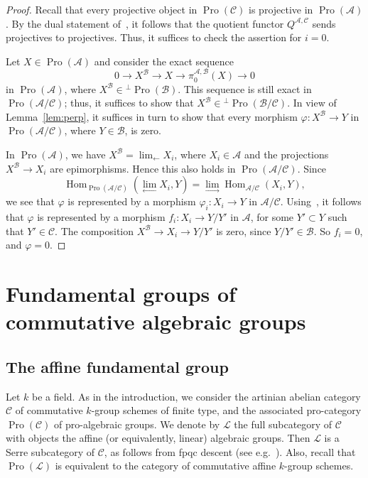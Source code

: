 \documentclass[11pt]{article}
\theoremstyle{definition}
\numberwithin{equation}{section}
\newcommand\cA{{\mathcal A}}
\newcommand\cB{{\mathcal B}}
\newcommand\cC{{\mathcal C}}
\newcommand\cL{{\mathcal L}}
\DeclareMathOperator{\Hom}{Hom}
\DeclareMathOperator{\Pro}{Pro}
\theoremstyle{remark}
\begin{document}
\begin{proof}
Recall that every projective object in $\Pro(\cC)$ is projective in $\Pro(\cA)$. By the dual statement of~\cite[III.3.Cor.~3]{Gabriel}, it follows that the quotient functor $Q^{\cA,\cC}$ sends projectives to projectives. Thus, it suffices to check the assertion for $i = 0$.

Let $X \in \Pro(\cA)$ and consider the exact sequence
\[
0 \longrightarrow X^{\cB} \longrightarrow X
\longrightarrow \pi_0^{\cA,\cB}(X) \longrightarrow 0
\]
in $\Pro(\cA)$, where $X^{\cB} \in {^{\perp}\Pro(\cB)}$. This sequence is still exact in $\Pro(\cA/\cC)$; thus, it suffices to show that $X^{\cB} \in {^{\perp}\Pro(\cB/\cC)}$. In view of Lemma~\ref{lem:perp}, it suffices in turn to show that every morphism $\varphi : X^{\cB} \to Y$ in $\Pro(\cA/\cC)$, where $Y \in \cB$, is zero.

In $\Pro(\cA)$, we have $X^{\cB} = \lim_{\leftarrow} X_i$, where $X_i \in \cA$ and the projections~$X^{\cB} \to X_i$ are epimorphisms. Hence this also holds in $\Pro(\cA/\cC)$. Since
\[
\Hom_{\Pro(\cA/\cC)}(\lim_{\leftarrow} X_i, Y) = \lim_{\to} \Hom_{\cA/\cC}(X_i, Y),
\]
we see that $\varphi$ is represented by a morphism $\varphi_i : X_i \to Y$ in $\cA/\cC$. Using~\cite[Lem.~2.7]{Br17b}, it follows that $\varphi$ is represented by a morphism $f_i : X_i \to Y/Y'$ in $\cA$, for some $Y' \subset Y$ such that $Y' \in \cC$. The composition $X^{\cB} \to X_i \to Y/Y'$ is zero, since $Y/Y' \in \cB$. So $f_i = 0$, and $\varphi = 0$.
\end{proof}


\section{Fundamental groups of commutative algebraic groups}\label{sec:fundamental}

\subsection{The affine fundamental group}\label{subsec:affine}

Let $k$ be a field. As in the introduction, we consider the artinian abelian category $\cC$ of commutative $k$-group schemes of finite type, and the associated pro-category $\Pro(\cC)$ of pro-algebraic groups. We denote by $\cL$ the full subcategory of $\cC$ with objects the affine (or equivalently, linear) algebraic groups. Then $\cL$ is a Serre subcategory of $\cC$, as follows from fpqc descent (see e.g.~\cite[34.20.18]{SP}). Also, recall that $\Pro(\cL)$ is equivalent to the category of commutative affine $k$-group schemes.
\end{document}
